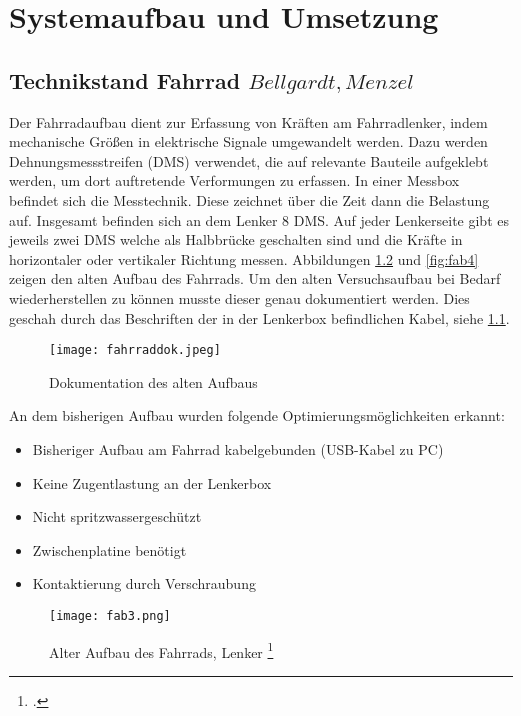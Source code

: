 \chapter{Systemaufbau und Umsetzung}
\label{ch:systemaufbau}
\section{Technikstand Fahrrad \(Bellgardt, Menzel\)}
\label{sec:technikstandfahrrad}
Der Fahrradaufbau dient zur Erfassung von Kräften am Fahrradlenker, indem mechanische Größen in elektrische Signale umgewandelt werden.
Dazu werden Dehnungsmessstreifen (DMS) verwendet, die auf relevante Bauteile aufgeklebt werden, um dort auftretende Verformungen zu erfassen.
In einer Messbox befindet sich die Messtechnik. Diese zeichnet über die Zeit dann die Belastung auf. Insgesamt befinden sich an dem Lenker 8 DMS.
Auf jeder Lenkerseite gibt es jeweils zwei DMS welche als Halbbrücke geschalten sind und die Kräfte in horizontaler oder vertikaler Richtung messen. 
Abbildungen \ref{fig:fab3} und \ref{fig:fab4} zeigen den alten Aufbau des Fahrrads.
Um den alten Versuchsaufbau bei Bedarf wiederherstellen zu können musste dieser genau dokumentiert werden.
Dies geschah durch das Beschriften der in der Lenkerbox befindlichen Kabel, siehe \ref{fig:fahrraddok}.
\begin{figure}[h]
    \begin{center}
        \texttt{[image: fahrraddok.jpeg]}
        \caption[Dokumentation des alten Aufbaus (Abbildungsverzeichnis)]{Dokumentation des alten Aufbaus
        \cite{LearnChannel}
        }
        \label{fig:fahrraddok}
    \end{center}
\end{figure}




An dem bisherigen Aufbau wurden folgende Optimierungsmöglichkeiten erkannt:
\begin{itemize}
    \item Bisheriger Aufbau am Fahrrad kabelgebunden (USB-Kabel zu PC)
    \item Keine Zugentlastung an der Lenkerbox
    \item Nicht spritzwassergeschützt
    \item Zwischenplatine benötigt
    \item Kontaktierung durch Verschraubung
\end{itemize}

\begin{figure}[htbp]
    \begin{center}
        \texttt{[image: fab3.png]}
        \caption[Alter Aufbau des Fahrrads, Lenker (Abbildungsverzeichnis)]{Alter Aufbau des Fahrrads, Lenker
        \footcite{Rechter Teil des Bildes: Praktikum Schwingbruchgefaehrdete Bauteile sicher dimensionieren und betreiben
        }
        }
        \label{fig:fab3}
    \end{center}
\end{figure}


